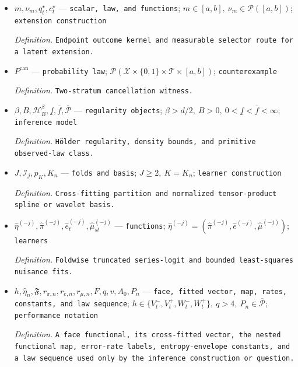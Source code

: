 \documentclass{article}
\begin{document}
\begin{itemize}
  \item \(m,\nu_m,q_t^\star,c_t^\star\) --- \texttt{scalar,\allowbreak{} law,\allowbreak{} and functions}; \(m\in[a,b],\ \nu_m\in\mathcal P([a,b])\); \texttt{extension construction}
  \par\smallskip\noindent\emph{Definition.} \texttt{Endpoint outcome kernel and measurable selector route for a latent extension.}
  \item \(P^{\mathrm{can}}\) --- \texttt{probability law}; \(\mathcal P(\mathcal X\times\{0,1\}\times\mathcal T\times[a,b])\); \texttt{counterexample}
  \par\smallskip\noindent\emph{Definition.} \texttt{Two-\allowbreak{}stratum cancellation witness.}
  \item \(\beta,B,\mathcal H_B^\beta,\underline f,\bar f,\overline{\mathcal P}\) --- \texttt{regularity objects}; \(\beta>d/2,\ B>0,\ 0<\underline f<\bar f<\infty\); \texttt{inference model}
  \par\smallskip\noindent\emph{Definition.} \texttt{Hölder regularity,\allowbreak{} density bounds,\allowbreak{} and primitive observed-\allowbreak{}law class.}
  \item \(J,\mathcal I_j,p_K,K_n\) --- \texttt{folds and basis}; \(J\ge2,\ K=K_n\); \texttt{learner construction}
  \par\smallskip\noindent\emph{Definition.} \texttt{Cross-\allowbreak{}fitting partition and normalized tensor-\allowbreak{}product spline or wavelet basis.}
  \item \(\widehat\eta^{(-j)},\widehat\pi^{(-j)},\widehat e_t^{(-j)},\widehat\mu_{st}^{(-j)}\) --- \texttt{functions}; \(\widehat\eta^{(-j)}=(\widehat\pi^{(-j)},\widehat e^{(-j)},\widehat\mu^{(-j)})\); \texttt{learners}
  \par\smallskip\noindent\emph{Definition.} \texttt{Foldwise truncated series-\allowbreak{}logit and bounded least-\allowbreak{}squares nuisance fits.}
  \item \(h,\widehat\eta_n,\mathfrak F,r_{\pi,n},r_{e,n},r_{\mu,n},F,q,v,A_0,P_n\) --- \texttt{face,\allowbreak{} fitted vector,\allowbreak{} map,\allowbreak{} rates,\allowbreak{} constants,\allowbreak{} and law sequence}; \(h\in\{V_t^-,V_t^+,W_t^-,W_t^+\},\ q>4,\ P_n\in\overline{\mathcal P}\); \texttt{performance notation}
  \par\smallskip\noindent\emph{Definition.} \texttt{A face functional,\allowbreak{} its cross-\allowbreak{}fitted vector,\allowbreak{} the nested functional map,\allowbreak{} error-\allowbreak{}rate labels,\allowbreak{} entropy-\allowbreak{}envelope constants,\allowbreak{} and a law sequence used only by the inference construction or question.}

\end{itemize}
\end{document}
